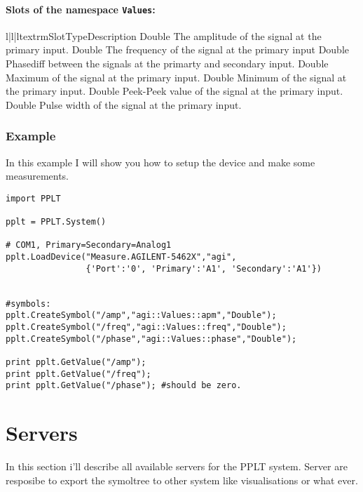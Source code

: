 \paragraph{Slots of the namespace \texttt{Values}:} 
\begin{tableiii}{l|l|l}{textrm}{Slot}{Type}{Description}
        {Double}
        {The amplitude of the signal at the primary input.}
        {Double}
        {The frequency of the signal at the primary input}
        {Double}
        {Phasediff between the signals at the primarty and secondary input.}
        {Double}
        {Maximum of the signal at the primary input.}
        {Double}
        {Minimum of the signal at the primary input.}
        {Double}
        {Peek-Peek value of the signal at the primary input.}
        {Double}
        {Pulse width of the signal at the primary input.}
\end{tableiii}        


\subsubsection{Example}
In this example I will show you how to setup the device and make some measurements.
\begin{verbatim}
import PPLT

pplt = PPLT.System()

# COM1, Primary=Secondary=Analog1
pplt.LoadDevice("Measure.AGILENT-5462X","agi",
                {'Port':'0', 'Primary':'A1', 'Secondary':'A1'})


#symbols:
pplt.CreateSymbol("/amp","agi::Values::apm","Double");
pplt.CreateSymbol("/freq","agi::Values::freq","Double");
pplt.CreateSymbol("/phase","agi::Values::phase","Double");

print pplt.GetValue("/amp");
print pplt.GetValue("/freq");
print pplt.GetValue("/phase"); #should be zero.

\end{verbatim}







\section{Servers}
In this section i'll describe all available servers for the PPLT system. 
Server are resposibe to export the symoltree to other system like 
visualisations or what ever. 

